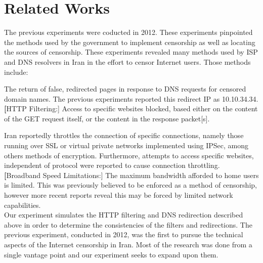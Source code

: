 \section{Related Works}\label{sec:relatedworks}

The previous experiments were coducted in 2012. These experiments pinpointed the methods used by the government to implement censorship as well as locating the sources of censorship. These experiments revealed many methods used by ISP and DNS resolvers in Iran in the effort to censor Internet users. Those methods include:


\item[DNS Redirection:] The return of false, redirected pages in response to DNS requests for censored domain names. The previous experiments reported this redirect IP as 10.10.34.34.\\
\textbf[HTTP Filtering:] Access to specific websites blocked, based either on the content of the GET request itself, or the content in the response packet[s].\\
\item[Connection Throttling:] Iran reportedly throttles the connection of specific connections, namely those running over SSL or virtual private networks implemented using IPSec, among others methods of encryption. Furthermore, attempts to access specific websites, independent of protocol were reported to cause connection throttling.\\
\textbf[Broadband Speed Limitations:] The maximum bandwidth afforded to home user\’s is limited. This was previously believed to be enforced as a method of censorship, however more recent reports reveal this may be forced by limited network capabilities.\\
Our experiment simulates the HTTP filtering and DNS redirection described above in order to determine the consistencies of the filters and redirections. The previous experiment, conducted in 2012, was the first to pursue the technical aspects of the Internet censorship in Iran. Most of the research was done from a single vantage point and our experiment seeks to expand upon them.\\
